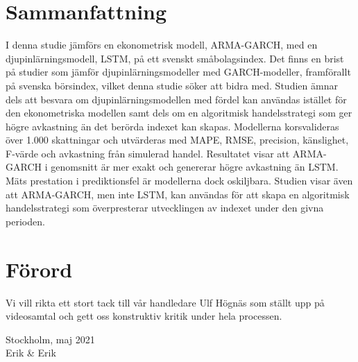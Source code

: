 \documentclass[11pt]{article}
\numberwithin{equation}{section}
\numberwithin{table}{section}
\numberwithin{figure}{section}
\begin{document}
\section*{Sammanfattning}
I denna studie jämförs en ekonometrisk modell, ARMA-GARCH, med en djupinlärningsmodell, LSTM, på ett svenskt småbolagsindex. Det finns en brist på studier som jämför djupinlärningsmodeller med GARCH-modeller, framförallt på svenska börsindex, vilket denna studie söker att bidra med. Studien ämnar dels att besvara om djupinlärningsmodellen med fördel kan användas istället för den ekonometriska modellen samt dels om en algoritmisk handelsstrategi som ger högre avkastning än det berörda indexet kan skapas. Modellerna korsvalideras över 1.000 skattningar och utvärderas med MAPE, RMSE, precision, känslighet, F-värde och avkastning från simulerad handel. Resultatet visar att ARMA-GARCH i genomsnitt är mer exakt och genererar högre avkastning än LSTM. Mäts prestation i prediktionsfel är modellerna dock oskiljbara. Studien visar även att ARMA-GARCH, men inte LSTM, kan användas för att skapa en algoritmisk handelsstrategi som överpresterar utvecklingen av indexet under den givna perioden. 

\newpage
\section*{Förord}
Vi vill rikta ett stort tack till vår handledare Ulf Högnäs som ställt upp på
videosamtal och gett oss konstruktiv kritik under hela processen. \bigbreak

Stockholm, maj 2021 \\
Erik \& Erik
\null
\newpage

\newpage
\thispagestyle{empty}
    \tableofcontents
\thispagestyle{empty}
\newpage

\newpage 
\thispagestyle{empty}
\end{document}
